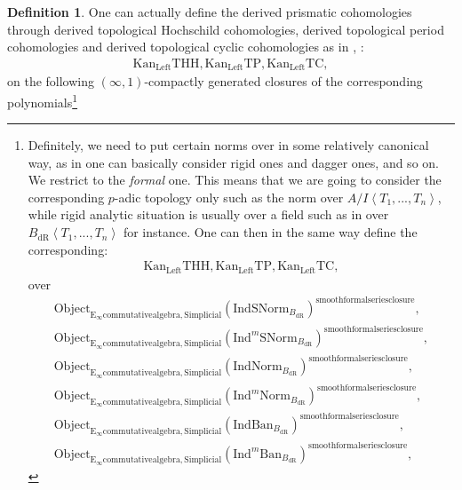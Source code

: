 \documentclass[11pt]{book}
\theoremstyle{definition}
\newtheorem{definition}[theorem]{Definition}
\numberwithin{equation}{section}
\begin{document}
\begin{definition}
\indent One can actually define the derived prismatic cohomologies through derived topological Hochschild cohomologies, derived topological period cohomologies and derived topological cyclic cohomologies as in \cite[Section 2.2, Section 2.3]{12BMS}, \cite[Theorem 1.13]{12BS}:
\begin{align}
	\mathrm{Kan}_{\mathrm{Left}}\mathrm{THH},\mathrm{Kan}_{\mathrm{Left}}\mathrm{TP},\mathrm{Kan}_{\mathrm{Left}}\mathrm{TC},
\end{align}
on the following $(\infty,1)$-compactly generated closures of the corresponding polynomials\footnote{Definitely, we need to put certain norms over in some relatively canonical way, as in \cite[Section 4.2]{BBM} one can basically consider rigid ones and dagger ones, and so on. We restrict to the \textit{formal} one. This means that we are going to consider the corresponding $p$-adic topology only such as the norm over $A/I\left<T_1,...,T_n\right>$, while rigid analytic situation is usually over a field such as in \cite{G2} over $B_\mathrm{dR}\left<T_1,...,T_n\right>$ for instance. One can then in the same way define the corresponding:
\begin{align}
	\mathrm{Kan}_{\mathrm{Left}}\mathrm{THH},\mathrm{Kan}_{\mathrm{Left}}\mathrm{TP},\mathrm{Kan}_{\mathrm{Left}}\mathrm{TC},
\end{align}
over 
\begin{align}
\mathrm{Object}_{\mathrm{E}_\infty\mathrm{commutativealgebra},\mathrm{Simplicial}}(\mathrm{IndSNorm}_{B_\mathrm{dR}})^{\mathrm{smoothformalseriesclosure}},\\
\mathrm{Object}_{\mathrm{E}_\infty\mathrm{commutativealgebra},\mathrm{Simplicial}}(\mathrm{Ind}^m\mathrm{SNorm}_{B_\mathrm{dR}})^{\mathrm{smoothformalseriesclosure}},\\
\mathrm{Object}_{\mathrm{E}_\infty\mathrm{commutativealgebra},\mathrm{Simplicial}}(\mathrm{IndNorm}_{B_\mathrm{dR}})^{\mathrm{smoothformalseriesclosure}},\\
\mathrm{Object}_{\mathrm{E}_\infty\mathrm{commutativealgebra},\mathrm{Simplicial}}(\mathrm{Ind}^m\mathrm{Norm}_{B_\mathrm{dR}})^{\mathrm{smoothformalseriesclosure}},\\
\mathrm{Object}_{\mathrm{E}_\infty\mathrm{commutativealgebra},\mathrm{Simplicial}}(\mathrm{IndBan}_{B_\mathrm{dR}})^{\mathrm{smoothformalseriesclosure}},\\
\mathrm{Object}_{\mathrm{E}_\infty\mathrm{commutativealgebra},\mathrm{Simplicial}}(\mathrm{Ind}^m\mathrm{Ban}_{B_\mathrm{dR}})^{\mathrm{smoothformalseriesclosure}},

\end{align}}
\end{definition}
\end{document}
